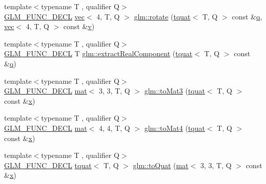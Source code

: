 \begin{DoxyCompactItemize}
\item 
{\footnotesize template$<$typename T , qualifier Q$>$ }\\\hyperlink{setup_8hpp_ab2d052de21a70539923e9bcbf6e83a51}{G\+L\+M\+\_\+\+F\+U\+N\+C\+\_\+\+D\+E\+CL} \hyperlink{structglm_1_1vec}{vec}$<$ 4, T, Q $>$ \hyperlink{group__gtx__quaternion_ga97a5f8af1d63056b85a53ac28042fe77}{glm\+::rotate} (\hyperlink{structglm_1_1tquat}{tquat}$<$ T, Q $>$ const \&\hyperlink{_s_d_l__opengl_8h_a8fc1e7b9baaae687804c7eed46ca09c6}{q}, \hyperlink{structglm_1_1vec}{vec}$<$ 4, T, Q $>$ const \&\hyperlink{_s_d_l__opengl_8h_a10a82eabcb59d2fcd74acee063775f90}{v})
\item 
{\footnotesize template$<$typename T , qualifier Q$>$ }\\\hyperlink{setup_8hpp_ab2d052de21a70539923e9bcbf6e83a51}{G\+L\+M\+\_\+\+F\+U\+N\+C\+\_\+\+D\+E\+CL} T \hyperlink{group__gtx__quaternion_ga312385d0a8caa24c1daaa1d00ce4c2d3}{glm\+::extract\+Real\+Component} (\hyperlink{structglm_1_1tquat}{tquat}$<$ T, Q $>$ const \&\hyperlink{_s_d_l__opengl_8h_a8fc1e7b9baaae687804c7eed46ca09c6}{q})
\item 
{\footnotesize template$<$typename T , qualifier Q$>$ }\\\hyperlink{setup_8hpp_ab2d052de21a70539923e9bcbf6e83a51}{G\+L\+M\+\_\+\+F\+U\+N\+C\+\_\+\+D\+E\+CL} \hyperlink{structglm_1_1mat}{mat}$<$ 3, 3, T, Q $>$ \hyperlink{group__gtx__quaternion_ga433955cb703d982427fb53b540d02f3d}{glm\+::to\+Mat3} (\hyperlink{structglm_1_1tquat}{tquat}$<$ T, Q $>$ const \&\hyperlink{_s_d_l__opengl_8h_ad0e63d0edcdbd3d79554076bf309fd47}{x})
\item 
{\footnotesize template$<$typename T , qualifier Q$>$ }\\\hyperlink{setup_8hpp_ab2d052de21a70539923e9bcbf6e83a51}{G\+L\+M\+\_\+\+F\+U\+N\+C\+\_\+\+D\+E\+CL} \hyperlink{structglm_1_1mat}{mat}$<$ 4, 4, T, Q $>$ \hyperlink{group__gtx__quaternion_ga1fa0fb798c2715148e2e0358442bf895}{glm\+::to\+Mat4} (\hyperlink{structglm_1_1tquat}{tquat}$<$ T, Q $>$ const \&\hyperlink{_s_d_l__opengl_8h_ad0e63d0edcdbd3d79554076bf309fd47}{x})
\item 
{\footnotesize template$<$typename T , qualifier Q$>$ }\\\hyperlink{setup_8hpp_ab2d052de21a70539923e9bcbf6e83a51}{G\+L\+M\+\_\+\+F\+U\+N\+C\+\_\+\+D\+E\+CL} \hyperlink{structglm_1_1tquat}{tquat}$<$ T, Q $>$ \hyperlink{group__gtx__quaternion_gae9be791077b7a612d9092a922bd13f86}{glm\+::to\+Quat} (\hyperlink{structglm_1_1mat}{mat}$<$ 3, 3, T, Q $>$ const \&\hyperlink{_s_d_l__opengl_8h_ad0e63d0edcdbd3d79554076bf309fd47}{x})

\end{DoxyCompactItemize}
